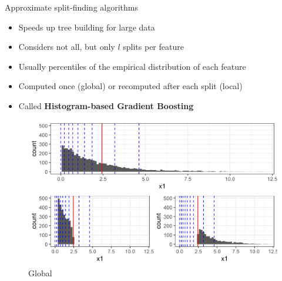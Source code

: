 \documentclass[11pt,compress,t,notes=noshow, xcolor=table]{beamer}
\begin{document}
\begin{vbframe}{Approximate split-finding algorithms}

\begin{itemize}
\item Speeds up tree building for large data
\item Considers not all, but only $l$ splits per feature
\item Usually percentiles of the empirical distribution of each feature
\item Computed once (global) or recomputed after each split (local)
\item Called \textbf{Histogram-based Gradient Boosting}
\end{itemize}




  \begin{small}
    \begin{minipage}[b]{0.49\textwidth}
      \begin{figure}
        \includegraphics[width=\textwidth]{figure/split_finding_1.png}
        \caption*{Global}
      \end{figure}


\end{minipage}
\end{small}
\end{vbframe}
\end{document}

